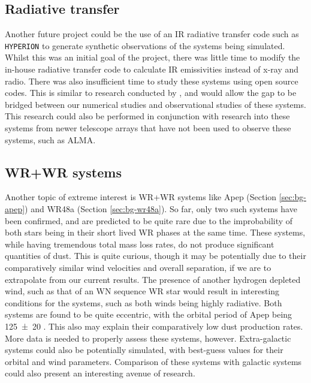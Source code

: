 \subsection{Radiative transfer}

Another future project could be the use of an IR radiative transfer code such as \texttt{HYPERION} \parencite{robitailleHYPERIONOpensourceParallelized2011} to generate synthetic observations of the systems being simulated.
Whilst this was an initial goal of the project, there was little time to modify the in-house radiative transfer code to calculate IR emissivities instead of x-ray and radio.
There was also insufficient time to study these systems using open source codes.
This is similar to research conducted by \textcite{hendrix_pinwheels_2016}, and would allow the gap to be bridged between our numerical studies and observational studies of these systems.
This research could also be performed in conjunction with research into these systems from newer telescope arrays that have not been used to observe these systems, such as ALMA.

\subsection{WR+WR systems}

Another topic of extreme interest is WR+WR systems like Apep (Section \ref{sec:bg-apep}) and WR48a (Section \ref{sec:bg-wr48a}).
So far, only two such systems have been confirmed, and are predicted to be quite rare due to the improbability of both stars being in their short lived WR phases at the same time.
These systems, while having tremendous total mass loss rates, do not produce significant quantities of dust.
This is quite curious, though it may be potentially due to their comparatively similar wind velocities and overall separation, if we are to extrapolate from our current results.
The presence of another hydrogen depleted wind, such as that of an WN sequence WR star would result in interesting conditions for the systems, such as both winds being highly radiative.
Both systems are found to be quite eccentric, with the orbital period of Apep being \SI{125(20)}{\year} \parencite{hanExtremeCollidingwindSystem2020}.
This also may explain their comparatively low dust production rates.
More data is needed to properly assess these systems, however.
Extra-galactic systems could also be potentially simulated, with best-guess values for their orbital and wind parameters.
Comparison of these systems with galactic systems could also present an interesting avenue of research.

